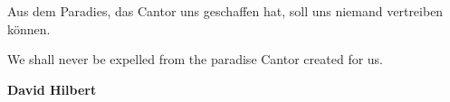   \begin{dedication}
    Aus dem Paradies, das Cantor uns geschaffen hat, soll uns niemand vertreiben können. 
    \par   %
    \vspace{2\baselineskip}
    We shall never be expelled from the paradise Cantor created for us.

    \vspace{\baselineskip}
    
    \textbf{David Hilbert}
  \end{dedication}
